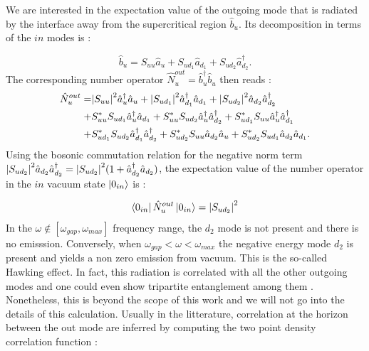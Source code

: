 We are interested in the expectation value of the outgoing mode that is radiated by the interface away from the supercritical region $\hat{b}_u$.
Its decomposition in terms of the $in$ modes is :

\begin{equation}
    \hat{b}_u = S_{uu}\hat{a}_u + S_{ud_1}\hat{a}_{d_1} + S_{ud_2}\hat{a}_{d_2}^\dagger.
\end{equation}
The corresponding number operator $\hat{N}_u^{out}=\hat{b}_u^\dagger\hat{b}_u$ then reads :
\begin{equation}
    \begin{aligned}
        \hat{N}_u^{out} = &\abs{S_{uu}}^2\hat{a}_u^\dagger\hat{a}_u + \abs{S_{ud_1}}^2\hat{a}_{d_1}^\dagger\hat{a}_{d_1} + \abs{S_{ud_2}}^2\hat{a}_{d_2}\hat{a}_{d_2}^\dagger \\ 
        + & S_{uu}^*S_{ud_1}\hat{a}_u^\dagger\hat{a}_{d_1}+ S_{uu}^*S_{ud_2}\hat{a}_u^\dagger\hat{a}_{d_2}^\dagger + S_{ud_1}^*S_{uu}\hat{a}_u^\dagger\hat{a}_{d_1}^\dagger  \\
        + & S_{ud_1}^*S_{ud_2}\hat{a}_{d_1}^\dagger\hat{a}_{d_2}^\dagger+ S_{ud_2}^*S_{uu}\hat{a}_{d_2}\hat{a}_u+ S_{ud_2}^*S_{ud_1}\hat{a}_{d_2}\hat{a}_{d_1}. 
    \end{aligned}
\end{equation}
Using the bosonic commutation relation for the negative norm term $\abs{S_{ud_2}}^2\hat{a}_{d_2}\hat{a}_{d_2}^\dagger=\abs{S_{ud_2}}^2(1+\hat{a}_{d_2}^\dagger\hat{a}_{d_2})$, the expectation
value of the number operator in the $in$ vacuum state $\ket{0_{in}}$ is :

\begin{equation}
    \bra{0_{in}}\hat{N}_u^{out}\ket{0_{in}} = \abs{S_{ud_2}}^2 
\end{equation}
In the $\omega \notin [\omega_{gap}, \omega_{max}]$ frequency range, the $d_2$ mode is not present and there is no emisssion. Conversely, when $\omega_{gap}<\omega<\omega_{max}$ 
the negative energy mode $d_2$ is present and yields a non zero emission from vacuum. This is the so-called Hawking effect. In fact,
 this radiation is correlated with all the other outgoing modes and one could even show tripartite entanglement among them \cite{isoard_quantum_2019}. Nonetheless, this is beyond the
 scope of this work and we will not go into the details of this calculation. Usually in the litterature, correlation at the horizon 
 between the out mode are inferred by computing the two point density correlation function \cite{Recati_acousticHR_2009, nguyen_acoustic_2015} :

